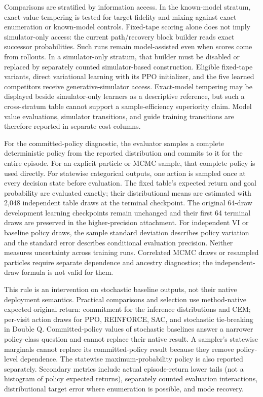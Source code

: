 Comparisons are stratified by information access.  In the known-model stratum,
exact-value tempering is tested for target fidelity and mixing against exact
enumeration or known-model controls. Fixed-tape scoring alone does not imply
simulator-only access: the current path/recovery block builder reads exact
successor probabilities. Such runs remain model-assisted even when scores
come from rollouts. In a simulator-only stratum, that builder must be disabled
or replaced by separately counted simulator-based construction. Eligible
fixed-tape variants, direct variational learning with its PPO initializer, and
the five learned competitors receive generative-simulator access. Exact-model
tempering may be displayed beside simulator-only learners as a descriptive
reference, but such a cross-stratum table cannot support a sample-efficiency
superiority claim.  Model value evaluations, simulator transitions, and guide
training transitions are therefore reported in separate cost columns.


For the committed-policy diagnostic, the evaluator samples a complete
deterministic policy from the reported distribution and commits to it for the
entire episode.  For an explicit particle or MCMC sample, that complete policy
is used directly.  For statewise categorical outputs, one action is sampled
once at every decision state before evaluation. The fixed table's expected
return and goal probability are evaluated exactly; their distributional means
are estimated with 2,048 independent table draws at the terminal checkpoint.
The original 64-draw development learning checkpoints remain unchanged and
their first 64 terminal draws are preserved in the higher-precision attachment.
For independent VI or baseline policy draws, the sample standard
deviation describes policy variation and the standard error describes
conditional evaluation precision. Neither measures uncertainty across training
runs. Correlated MCMC draws or resampled particles require separate dependence
and ancestry diagnostics; the independent-draw formula is not valid for them.

This rule is an intervention on stochastic baseline outputs, not their native
deployment semantics. Practical comparisons and selection use method-native
expected original return: commitment for the inference distributions and CEM;
per-visit action draws for PPO, REINFORCE, SAC, and stochastic tie-breaking in
Double Q. Committed-policy values of stochastic baselines answer a narrower
policy-class question and cannot replace their native result.
A sampler's statewise marginals cannot replace its committed-policy result
because they remove policy-level dependence. The statewise
maximum-probability policy is also reported separately. Secondary metrics
include actual episode-return lower tails (not a histogram of policy expected
returns), separately counted evaluation interactions,
distributional target error where enumeration is possible, and mode recovery.

